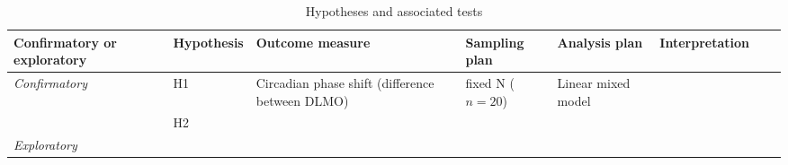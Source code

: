 \begin{table}[h]
\footnotesize
\centering
\caption{Hypotheses and associated tests}
\label{tbl_hypotheses}

\begin{tabularx}{\textwidth}{XXXXXXXX}
\toprule
Confirmatory or exploratory &
  Hypothesis &
  Outcome measure &
  Sampling plan &
  Analysis plan &
  Interpretation \\ 
\midrule
\multirow{2}{*}{\textit{Confirmatory}} &
  H1 &
  Circadian phase shift (difference between DLMO) &
  \multirow{3}{*}{fixed N ($n=20$)} &
  Linear mixed model &
   \\
                     & H2 &  &  &  &  \\
\textit{Exploratory} &    &  &  &  &  \\ 
\bottomrule
\end{tabularx}

\end{table}